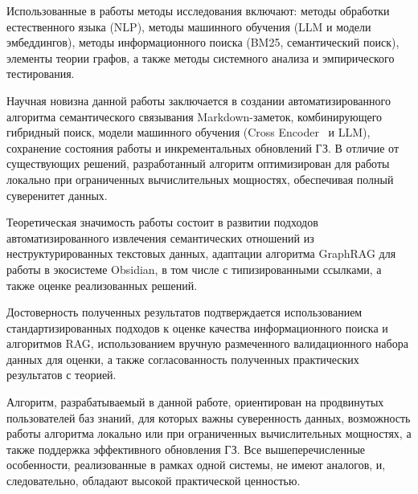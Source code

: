 Использованные в работы методы исследования включают:
методы обработки естественного языка (NLP),
методы машинного обучения (LLM и модели эмбеддингов),
методы информационного поиска (BM25, семантический поиск), элементы теории графов,
а также методы системного анализа и эмпирического тестирования.

Научная новизна данной работы заключается в создании
автоматизированного алгоритма семантического связывания Markdown-заметок,
комбинирующего гибридный поиск, модели машинного обучения
(Cross Encoder~\cite{Nogueira_2019} и LLM),
сохранение состояния работы и инкрементальных обновлений ГЗ.
В отличие от существующих решений, разработанный алгоритм
оптимизирован для работы локально при ограниченных вычислительных мощностях,
обеспечивая полный суверенитет данных.

Теоретическая значимость работы состоит в развитии подходов автоматизированного
извлечения семантических отношений из неструктурированных текстовых данных,
адаптации алгоритма GraphRAG для работы в экосистеме Obsidian,
в том числе с типизированными ссылками,
а также оценке реализованных решений.

Достоверность полученных результатов подтверждается использованием стандартизированных
подходов к оценке качества информационного поиска и алгоритмов RAG,
использованием вручную размеченного валидационного набора данных для оценки,
а также согласованность полученных практических результатов
с теорией.

Алгоритм, разрабатываемый в данной работе,
ориентирован на продвинутых пользователей баз знаний,
для которых важны суверенность данных,
возможность работы алгоритма локально
или при ограниченных вычислительных мощностях,
а также поддержка эффективного обновления ГЗ.
Все вышеперечисленные особенности,
реализованные в рамках одной системы,
не имеют аналогов, и, следовательно,
обладают высокой практической ценностью.
